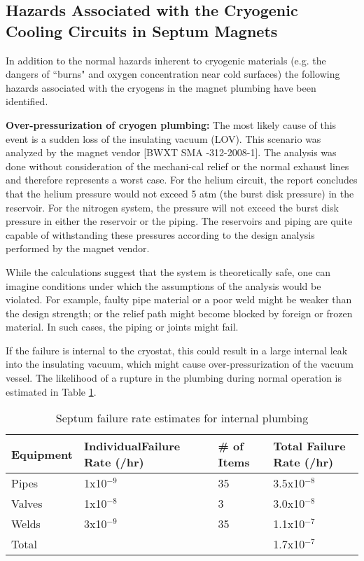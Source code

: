 {\begin{safetyen}{10}{15}
\subsection {\bf Hazards Associated with the Cryogenic Cooling Circuits in Septum Magnets}
\end{safetyen}

In addition to the normal hazards inherent to cryogenic materials (e.g. the dangers of ``burns" and 
oxygen concentration near cold surfaces) the following hazards associated with the cryogens in the 
magnet plumbing have been identified.

{\bf Over-pressurization of cryogen plumbing:}  The most likely cause of this event is a sudden 
loss of the insulating vacuum (LOV).  This scenario was analyzed by the magnet vendor [BWXT SMA -312-2008-1].  
The analysis was done without consideration of the mechani-cal relief or the normal exhaust lines and 
therefore represents a worst case.  For the helium circuit, the report concludes that the helium pressure 
would not exceed 5 atm (the burst disk pressure) in the reservoir.  For the nitrogen system, the pressure 
will not exceed the burst disk pressure in either the reservoir or the piping.  The reservoirs and piping 
are quite capable of withstanding these pressures according to the design analysis performed by the magnet vendor.

While the calculations suggest that the system is theoretically safe, one can imagine conditions under 
which the assumptions of the analysis would be violated.  For example, faulty pipe material or a poor 
weld might be weaker than the design strength; or the relief path might become blocked by foreign or 
frozen material.  In such cases, the piping or joints might fail.

If the failure is internal to the cryostat, this could result in a large internal leak into the insulating 
vacuum, which might cause over-pressurization of the vacuum vessel.  The likelihood of a rupture in the 
plumbing during normal operation is estimated in Table \ref{tab:septumfail}.

\begin{table}[htp]
\begin{tabular}{|l|l|l|l|}
\hline
Equipment   & IndividualFailure Rate (/hr) & \# of Items & Total Failure Rate (/hr) \\ \hline
Pipes       & 1x10$^{-9}$                  & 35          & 3.5x10$^{-8}$\\
Valves      & 1x10$^{-8}$                  & 3           & 3.0x10$^{-8}$\\
Welds       & 3x10$^{-9}$                  & 35          & 1.1x10$^{-7}$\\ \hline
Total       &                              &             & 1.7x10$^{-7}$ \\ \hline
\end{tabular}
\caption[Septum: failures]{Septum failure rate estimates for internal plumbing }
\label{tab:septumfail}
\end{table}
	


}
